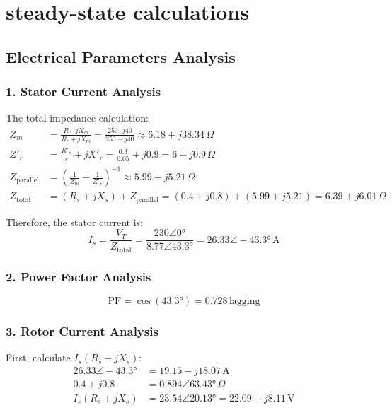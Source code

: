 \documentclass[a4paper,12pt]{article}
\begin{document}
 
\section{steady-state calculations }
 
\label{sec:results}

\subsection{Electrical Parameters Analysis}

\subsubsection{1. Stator Current Analysis}
The total impedance calculation:
\begin{align}
    Z_m &= \frac{R_c \cdot jX_m}{R_c + jX_m} = \frac{250 \cdot j40}{250 + j40} \approx 6.18 + j38.34\,\Omega \\
    Z'_r &= \frac{R'_r}{s} + jX'_r = \frac{0.3}{0.05} + j0.9 = 6 + j0.9\,\Omega \\
    Z_{\text{parallel}} &= \left(\frac{1}{Z_m} + \frac{1}{Z'_r}\right)^{-1} \approx 5.99 + j5.21\,\Omega \\
    Z_{\text{total}} &= (R_s + jX_s) + Z_{\text{parallel}} = (0.4 + j0.8) + (5.99 + j5.21) = 6.39 + j6.01\,\Omega
\end{align}

Therefore, the stator current is:
\begin{equation}
    I_s = \frac{V_T}{Z_{\text{total}}} = \frac{230\angle 0°}{8.77\angle 43.3°} = 26.33\angle -43.3°\,\text{A}
\end{equation}

\subsubsection{2. Power Factor Analysis}
\begin{equation}
    \text{PF} = \cos(43.3°) = 0.728\,\text{lagging}
\end{equation}

\subsubsection{3. Rotor Current Analysis}
First, calculate $I_s(R_s + jX_s)$:
\begin{align}
    26.33\angle -43.3° &= 19.15 - j18.07\,\text{A} \\
    0.4 + j0.8 &= 0.894\angle 63.43°\,\Omega \\
    I_s(R_s + jX_s) &= 23.54\angle 20.13° = 22.09 + j8.11\,\text{V}
\end{align}
\end{document}
